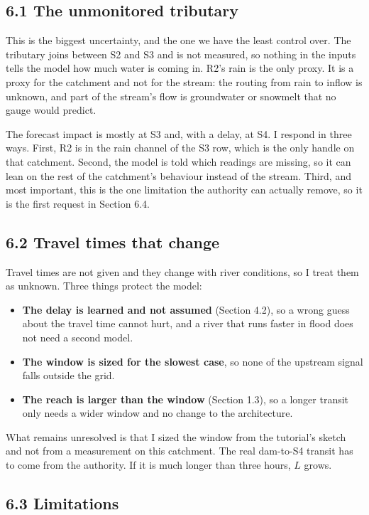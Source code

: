 \documentclass[11pt,letterpaper]{article}
\begin{document}
\subsection*{6.1 The unmonitored tributary}

This is the biggest uncertainty, and the one we have the least control over. The
tributary joins between S2 and S3 and is not measured, so nothing in the inputs
tells the model how much water is coming in. R2's rain is the only proxy. It is a
proxy for the catchment and not for the stream: the routing from rain to inflow is
unknown, and part of the stream's flow is groundwater or snowmelt that no gauge
would predict.

The forecast impact is mostly at S3 and, with a delay, at S4. I respond in three
ways. First, R2 is in the rain channel of the S3 row, which is the only handle on
that catchment. Second, the model is told which readings are missing, so it can lean
on the rest of the catchment's behaviour instead of the stream. Third, and most
important, this is the one limitation the authority can actually remove, so it is
the first request in Section 6.4.

\subsection*{6.2 Travel times that change}

Travel times are not given and they change with river conditions, so I treat them
as unknown. Three things protect the model:

\begin{itemize}
\item \textbf{The delay is learned and not assumed} (Section 4.2), so a wrong guess
about the travel time cannot hurt, and a river that runs faster in flood does not
need a second model.
\item \textbf{The window is sized for the slowest case}, so none of the upstream
signal falls outside the grid.
\item \textbf{The reach is larger than the window} (Section 1.3), so a longer
transit only needs a wider window and no change to the architecture.
\end{itemize}

What remains unresolved is that I sized the window from the tutorial's sketch and
not from a measurement on this catchment. The real dam-to-S4 transit has to come
from the authority. If it is much longer than three hours, $L$ grows.

\subsection*{6.3 Limitations}
\end{document}
